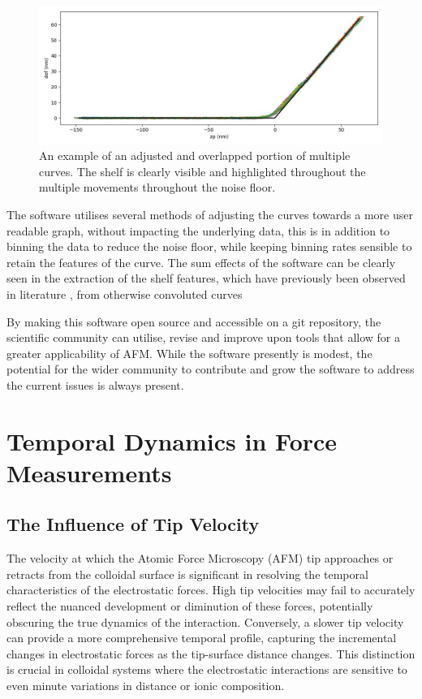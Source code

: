 \begin{figure}[h!]
\centering
\includegraphics[width=\textwidth]{chapter8/Shelf/Post 1.6 S4 df_zp.jpg}
\caption{An example of an adjusted and overlapped portion of multiple curves. The shelf is clearly visible and highlighted throughout the multiple movements throughout the noise floor.}
\label{fig:noisey}
\end{figure}

The software utilises several methods of adjusting the curves towards a more user readable graph, without impacting the underlying data, this is in addition to binning the data to reduce the noise floor, while keeping binning rates sensible to retain the features of the curve. The sum effects of the software can be clearly seen in the extraction of the shelf features, which have previously been observed in literature \cite{}, from otherwise convoluted curves %

By making this software open source and accessible on a git repository, the scientific community can utilise, revise and improve upon tools that allow for a greater applicability of AFM. While the software presently is modest, the potential for the wider community to contribute and grow the software to address the current issues is always present. \cite{YourGithub2023}

\section{Temporal Dynamics in Force Measurements}

\subsection{The Influence of Tip Velocity}
The velocity at which the Atomic Force Microscopy (AFM) tip approaches or retracts from the colloidal surface is significant in resolving the temporal characteristics of the electrostatic forces. High tip velocities may fail to accurately reflect the nuanced development or diminution of these forces, potentially obscuring the true dynamics of the interaction. Conversely, a slower tip velocity can provide a more comprehensive temporal profile, capturing the incremental changes in electrostatic forces as the tip-surface distance changes. This distinction is crucial in colloidal systems where the electrostatic interactions are sensitive to even minute variations in distance or ionic composition.

